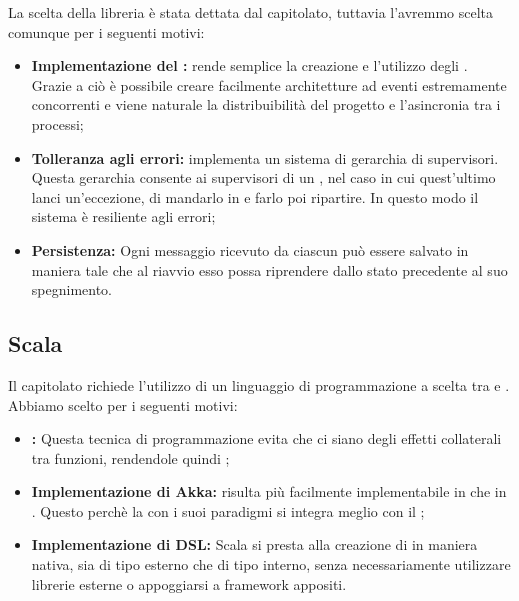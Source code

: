 \documentclass{scalatekids-article}
\begin{document}
La scelta della libreria  è stata dettata dal capitolato, tuttavia
l'avremmo scelta comunque per i seguenti motivi:
\begin{itemize}
\item\textbf{Implementazione del :} 
  rende semplice la creazione e l'utilizzo degli . Grazie a ciò è
  possibile creare facilmente architetture ad eventi estremamente concorrenti e
  viene naturale la distribuibilità del progetto e l'asincronia tra i processi;
\item\textbf{Tolleranza agli errori:}  implementa un sistema di
  gerarchia di supervisori. Questa gerarchia consente ai supervisori di un
  , nel caso in cui quest'ultimo lanci un'eccezione, di mandarlo
  in  e farlo poi ripartire. In questo modo il sistema è resiliente
  agli errori;
\item\textbf{Persistenza:} Ogni messaggio ricevuto da ciascun 
  può essere salvato in maniera tale che al riavvio esso possa riprendere dallo
  stato precedente al suo spegnimento.
\end{itemize}

\subsection{Scala}

Il capitolato richiede l'utilizzo di un linguaggio di programmazione a scelta
tra  e . Abbiamo scelto  per i seguenti
motivi:

\begin{itemize}
\item\textbf{:} Questa tecnica di
  programmazione evita che ci siano degli effetti collaterali tra funzioni,
  rendendole quindi ;
\item\textbf{Implementazione di Akka:}  risulta più
  facilmente implementabile in  che in . Questo perchè
  la  con i suoi paradigmi si integra meglio
  con il ;
\item\textbf{Implementazione di DSL:} Scala si presta alla creazione di 
  in maniera nativa, sia di tipo esterno che di tipo interno, senza necessariamente
  utilizzare librerie esterne o appoggiarsi a framework appositi.
\end{itemize}
\end{document}
